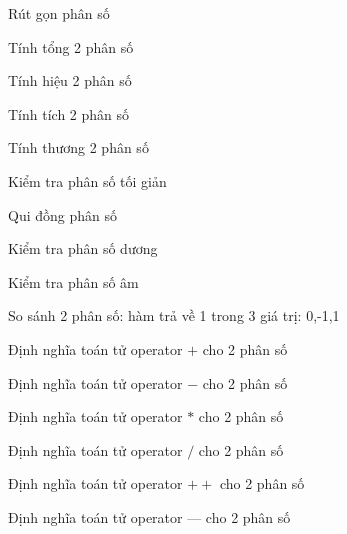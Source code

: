 \begin{problem}
    Rút gọn phân số
\end{problem}
\begin{problem}
    Tính tổng 2 phân số
\end{problem}
\begin{problem}
    Tính hiệu 2 phân số
\end{problem}
\begin{problem}
    Tính tích 2 phân số
\end{problem}
\begin{problem}
    Tính thương 2 phân số
\end{problem}
\begin{problem}
    Kiểm tra phân số tối giản
\end{problem}
\begin{problem}
    Qui đồng phân số
\end{problem}
\begin{problem}
    Kiểm tra phân số dương
\end{problem}
\begin{problem}
    Kiểm tra phân số âm
\end{problem}
\begin{problem}
    So sánh 2 phân số: hàm trả về 1 trong 3 giá trị: 0,-1,1
\end{problem}
\begin{problem}
    Định nghĩa toán tử operator $+$ cho 2 phân số
\end{problem}
\begin{problem}
    Định nghĩa toán tử operator $-$ cho 2 phân số
\end{problem}
\begin{problem}
    Định nghĩa toán tử operator $*$ cho 2 phân số
\end{problem}
\begin{problem}
    Định nghĩa toán tử operator $/$ cho 2 phân số
\end{problem}
\begin{problem}
    Định nghĩa toán tử operator $++$ cho 2 phân số
\end{problem}
\begin{problem}
    Định nghĩa toán tử operator $—$ cho 2 phân số
\end{problem}
\begin{problem}
    
\end{problem}
\begin{problem}
    
\end{problem}

